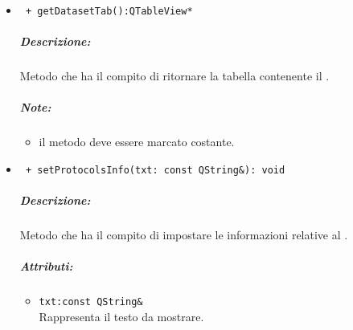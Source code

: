 \begin{itemize}
\item \color{blue} \verb! + getDatasetTab():QTableView*! 
\color{black}
\subparagraph{Descrizione:} Metodo che ha il compito di ritornare la tabella contenente il \dataset{}.
\subparagraph{Note:}
\begin{itemize}
\item il metodo deve essere marcato costante.
\end{itemize}

\item \color{blue} \verb! + setProtocolsInfo(txt: const QString&): void! 
\color{black}
\subparagraph{Descrizione:} Metodo che ha il compito di impostare le informazioni relative al \protocol{}.
\subparagraph{Attributi:}
\begin{itemize}
\item \color{RoyalPurple} \verb!txt:const QString& ! \\ Rappresenta il testo da mostrare.
\end{itemize}


\end{itemize}

